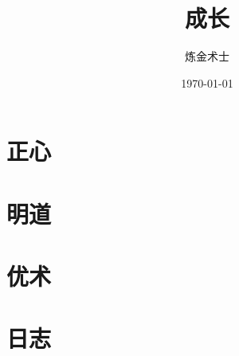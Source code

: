 \documentclass[UTF8]{ctexbook}
\title{成长}
\author{炼金术士}
\date{\today}
\begin{document}
\maketitle
\tableofcontents

\part{正心}





\part{明道}






\part{优术}












\part{日志}











\end{document}

